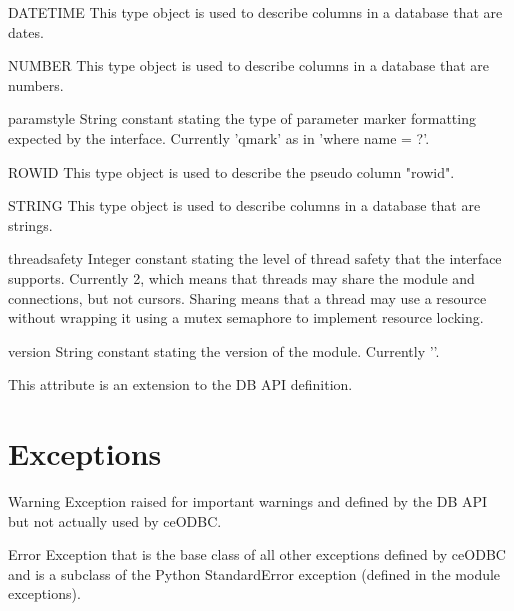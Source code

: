 \documentclass{manual}
\begin{document}
\begin{datadesc}{DATETIME}
  This type object is used to describe columns in a database that are dates.
\end{datadesc}

\begin{datadesc}{NUMBER}
  This type object is used to describe columns in a database that are numbers.
\end{datadesc}

\begin{datadesc}{paramstyle}
  String constant stating the type of parameter marker formatting expected by
  the interface. Currently 'qmark' as in 'where name = ?'.
\end{datadesc}

\begin{datadesc}{ROWID}
  This type object is used to describe the pseudo column "rowid".
\end{datadesc}

\begin{datadesc}{STRING}
  This type object is used to describe columns in a database that are strings.
\end{datadesc}

\begin{datadesc}{threadsafety}
  Integer constant stating the level of thread safety that the interface
  supports. Currently 2, which means that threads may share the module and
  connections, but not cursors. Sharing means that a thread may use a resource
  without wrapping it using a mutex semaphore to implement resource locking.
\end{datadesc}

\begin{datadesc}{version}
  String constant stating the version of the module. Currently '\version{}'.

   This attribute is an extension to the DB API definition.
\end{datadesc}

\section{Exceptions}\label{exceptions}

\begin{datadesc}{Warning}
  Exception raised for important warnings and defined by the DB API but not
  actually used by ceODBC.
\end{datadesc}

\begin{datadesc}{Error}
  Exception that is the base class of all other exceptions defined by
  ceODBC and is a subclass of the Python StandardError exception (defined in
  the module exceptions).
\end{datadesc}
\end{document}
